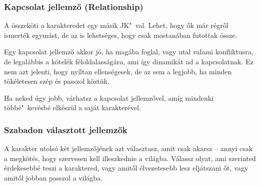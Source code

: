 \subsubsection{Kapcsolat jellemző (Relationship)}

A  összeköti a karakteredet egy másik JK"~val. Lehet, hogy ők már régről ismerték egymást, de az is lehetséges, hogy csak mostanában futottak össze.

Egy kapcsolat jellemző akkor jó, ha magába foglal, vagy utal valami konfliktusra, de legalábbis a kötelék féloldalasságára, ami így dinamikát ad a kapcsolatnak. Ez nem azt jelenti, hogy nyíltan ellenségesek, de az sem a legjobb, ha minden tökéletesen szép és passzol köztük.

Ha neked úgy jobb, várhatsz a kapcsolat jellemzővel, amíg mindenki többé"~kevésbé elkészül a saját karakterével.

\subsubsection{Szabadon választott jellemzők}

A karakter utolsó két jellemzőjének azt választasz, amit csak akarsz -- annyi csak a megkötés, hogy szervesen kell illeszkednie a világba. Válassz olyat, ami szerinted érdekesebbé teszi a karaktered, vagy amitől élvezetesebb lesz eljátszani őt, vagy amitől jobban passzol a világba.

